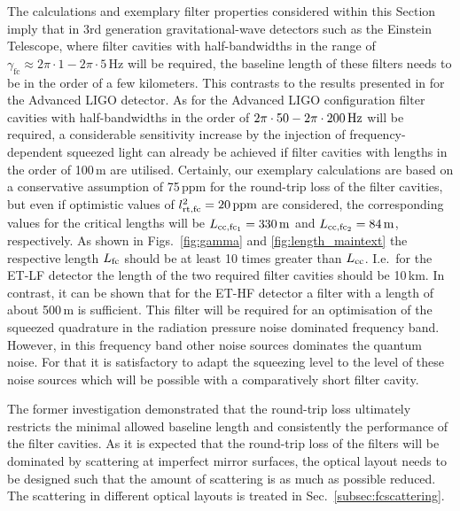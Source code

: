 The calculations and exemplary filter properties considered within
this Section imply that in 3rd generation gravitational-wave
detectors such as the Einstein Telescope, where filter cavities with half-bandwidths
in the range of ${\gamma_\text{fc}\approx 2\pi\cdot1- 2\pi\cdot5\,\mathrm{Hz}}$ will be
required, the baseline length of these filters needs to be in the
order of a few kilometers. This contrasts to the results presented
in \cite{Khalili2009} for the Advanced LIGO
detector. As for the Advanced LIGO configuration filter cavities with
half-bandwidths in the order of ${2\pi\cdot50- 2\pi\cdot200\,{\rm Hz}}$ will be required, a
considerable sensitivity increase by the injection of frequency-dependent squeezed light can already be achieved if filter
cavities with lengths in the order of 100\,m are utilised. Certainly,
our exemplary calculations are based on a conservative assumption
of 75\,ppm for the round-trip loss of the filter cavities, but
even if optimistic values of $l_{\rm rt,fc}^2=20\,\mathrm{ppm}$ are
considered, the corresponding values for the critical lengths will
be $L_{\rm cc, fc_1} = 330\,{\rm m}$ and  $L_{\rm cc, fc_2} =
84\,{\rm m}$, respectively. As shown in Figs.~\ref{fig:gamma}
and \ref{fig:length_maintext} the respective length $L_{\rm fc}$ should be
at least 10 times greater than $L_{\rm cc}$.   I.e.\ for the ET-LF detector the  length of the two required filter cavities should be 10\,km. In contrast, it can be shown that for the ET-HF detector a filter with a length of about 500\,m is sufficient. This filter will be required for an optimisation of the squeezed quadrature in the radiation pressure noise dominated frequency band. However, in this frequency band other noise sources dominates the quantum noise. For that it is satisfactory to adapt the squeezing level to the level of these noise sources which will be possible with a comparatively short filter cavity.



The former investigation demonstrated that  the round-trip loss ultimately restricts the minimal allowed baseline length and consistently the performance of the filter cavities. As it is expected that the round-trip loss of the filters will be dominated by scattering at imperfect mirror surfaces, the optical layout needs to be designed such that the amount of scattering is as much as possible reduced. The scattering in different optical layouts is treated in Sec.~\ref{subsec:fcscattering}.

